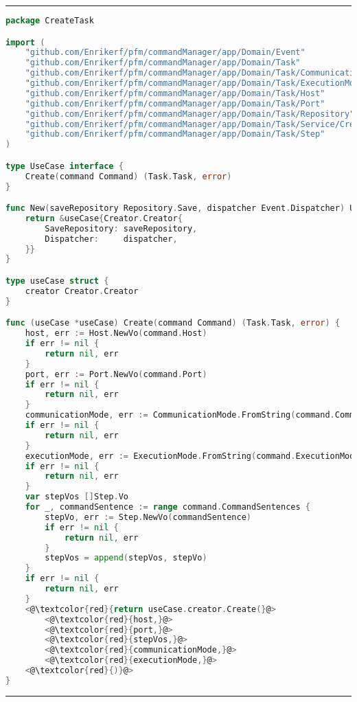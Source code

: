 
\phantom{blank}
\vspace{5mm}
\hrule
\begin{lstlisting}[language=Go,caption={CreateTaskUseCase.go},breaklines=true,label={lst:CreateTaskUseCaseCode}]
package CreateTask

import (
	"github.com/Enrikerf/pfm/commandManager/app/Domain/Event"
	"github.com/Enrikerf/pfm/commandManager/app/Domain/Task"
	"github.com/Enrikerf/pfm/commandManager/app/Domain/Task/CommunicationMode"
	"github.com/Enrikerf/pfm/commandManager/app/Domain/Task/ExecutionMode"
	"github.com/Enrikerf/pfm/commandManager/app/Domain/Task/Host"
	"github.com/Enrikerf/pfm/commandManager/app/Domain/Task/Port"
	"github.com/Enrikerf/pfm/commandManager/app/Domain/Task/Repository"
	"github.com/Enrikerf/pfm/commandManager/app/Domain/Task/Service/Creator"
	"github.com/Enrikerf/pfm/commandManager/app/Domain/Task/Step"
)

type UseCase interface {
	Create(command Command) (Task.Task, error)
}

func New(saveRepository Repository.Save, dispatcher Event.Dispatcher) UseCase {
	return &useCase{Creator.Creator{
		SaveRepository: saveRepository,
		Dispatcher:     dispatcher,
	}}
}

type useCase struct {
	creator Creator.Creator
}

func (useCase *useCase) Create(command Command) (Task.Task, error) {
	host, err := Host.NewVo(command.Host)
	if err != nil {
		return nil, err
	}
	port, err := Port.NewVo(command.Port)
	if err != nil {
		return nil, err
	}
	communicationMode, err := CommunicationMode.FromString(command.CommunicationMode)
	if err != nil {
		return nil, err
	}
	executionMode, err := ExecutionMode.FromString(command.ExecutionMode)
	if err != nil {
		return nil, err
	}
	var stepVos []Step.Vo
	for _, commandSentence := range command.CommandSentences {
		stepVo, err := Step.NewVo(commandSentence)
		if err != nil {
			return nil, err
		}
		stepVos = append(stepVos, stepVo)
	}
	if err != nil {
		return nil, err
	}
	<@\textcolor{red}{return useCase.creator.Create(}@>
		<@\textcolor{red}{host,}@>
		<@\textcolor{red}{port,}@>
		<@\textcolor{red}{stepVos,}@>
		<@\textcolor{red}{communicationMode,}@>
		<@\textcolor{red}{executionMode,}@>
	<@\textcolor{red}{)}@>
}


\end{lstlisting}
\hrule